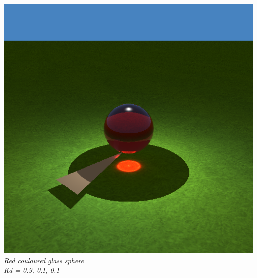 \documentclass[a4,12pt]{article}
\begin{document}
\begin{center}
\begin{minipage}[b]{0.40\linewidth}
\begin{center}
				\includegraphics[width = \textwidth]{./Worksheet8/redball_c.png}\\
				\textit{Red couloured glass sphere\\Kd = 0.9, 0.1, 0.1}\\
			\end{center}
		\end{minipage}
	\end{center}
	
\end{document}
